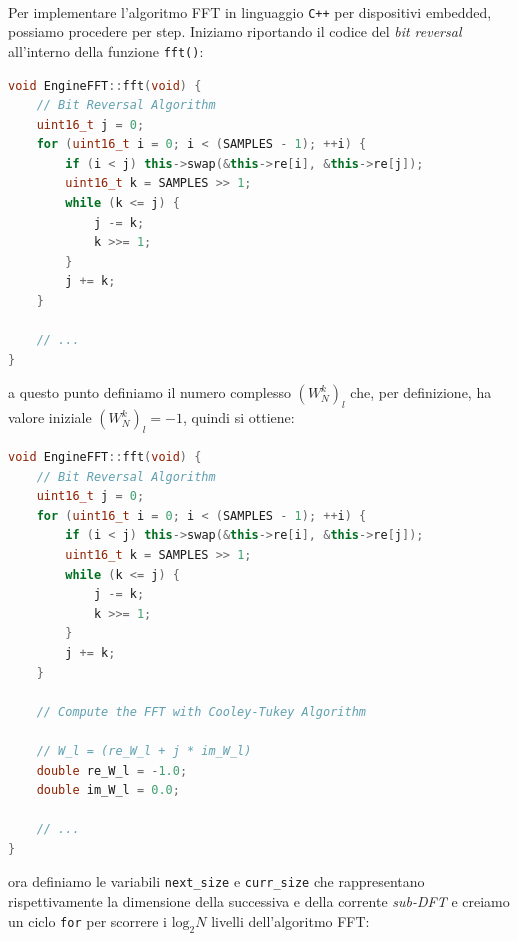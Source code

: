 \documentclass[a4paper,12pt]{report}  %
\newcommand{\lstinlinebg}[1]{\colorbox{backcolour}{\lstinline|#1|}}
\begin{document}
\noindent\\ Per implementare l'algoritmo FFT in linguaggio \lstinlinebg{C++} per dispositivi embedded, possiamo procedere per step.
Iniziamo riportando il codice del \textit{bit reversal} all'interno della funzione \lstinlinebg{fft()}:

\begin{lstlisting}[language=C++, keywords={void, uint16_t, while, for, if, this}]
void EngineFFT::fft(void) {
    // Bit Reversal Algorithm
    uint16_t j = 0;
    for (uint16_t i = 0; i < (SAMPLES - 1); ++i) {
        if (i < j) this->swap(&this->re[i], &this->re[j]);
        uint16_t k = SAMPLES >> 1;
        while (k <= j) {
            j -= k;
            k >>= 1;
        }
        j += k;
    }

    // ...
}
\end{lstlisting}

a questo punto definiamo il numero complesso $\left ( W_N^{k} \right )_l$ che, per definizione, ha valore iniziale $\left ( W_N^{k} \right )_l = -1$, quindi si ottiene:

\begin{lstlisting}[language=C++, keywords={void, uint16_t, while, for, SAMPLES, if, double, this}]
void EngineFFT::fft(void) {
    // Bit Reversal Algorithm
    uint16_t j = 0;
    for (uint16_t i = 0; i < (SAMPLES - 1); ++i) {
        if (i < j) this->swap(&this->re[i], &this->re[j]);
        uint16_t k = SAMPLES >> 1;
        while (k <= j) {
            j -= k;
            k >>= 1;
        }
        j += k;
    }

    // Compute the FFT with Cooley-Tukey Algorithm

    // W_l = (re_W_l + j * im_W_l)
    double re_W_l = -1.0;
    double im_W_l = 0.0;

    // ...
}
\end{lstlisting}

ora definiamo le variabili \lstinlinebg{next_size} e \lstinlinebg{curr_size} che rappresentano rispettivamente la dimensione della successiva e della corrente \textit{sub-DFT} e creiamo un ciclo \lstinlinebg{for} per scorrere i $\text{log}_2 N$ livelli dell'algoritmo FFT:
\end{document}
